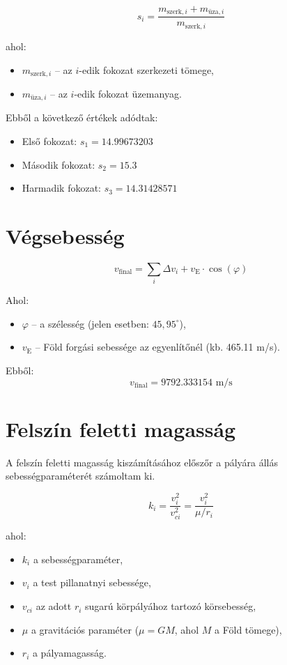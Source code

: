 \documentclass[a4paper,12pt]{article}
\begin{document}
\[
s_i = \frac{m_{\text{szerk},i} + m_{\text{üza},i}}{m_{\text{szerk},i}}
\]

ahol:
\begin{itemize}
  \item \( m_{\text{szerk},i} \) – az \(i\)-edik fokozat szerkezeti tömege,
  \item \( m_{\text{üza},i} \) – az \(i\)-edik fokozat üzemanyag.
\end{itemize}

Ebből a következő értékek adódtak:
\begin{itemize}
    \item Első fokozat: \(s_1 = 14.99673203\)
    \item Második fokozat: \(s_2 = 15.3\)
    \item Harmadik fokozat: \(s_3 = 14.31428571\)
\end{itemize}

\section{Végsebesség}
\[
v_{\text{final}} = \sum_i \Delta v_i + v_{\text{E}} \cdot \cos(\varphi)
\]

Ahol:
\begin{itemize}
  \item \( \varphi \) – a szélesség (jelen esetben: \(45{,}95^\circ\)),
  \item \( v_{\text{E}} \) – Föld forgási sebessége az egyenlítőnél (kb. 465.11 m/s).
\end{itemize}

Ebből:
\[
v_{\text{final}} = 9792.333154 \text{ m/s}
\]


\section{Felszín feletti magasság}

A felszín feletti magasság kiszámításához előszőr a pályára állás sebességparaméterét számoltam ki.

\[
  k_i = \frac{v_i^2}{v_{ci}^2} = \frac{v_i^2}{\mu / r_i}
\]
  
ahol:
\begin{itemize}
    \item $k_i$ a sebességparaméter,
    \item $v_i$ a test pillanatnyi sebessége,
    \item $v_{ci}$ az adott $r_i$ sugarú körpályához tartozó körsebesség,
    \item $\mu$ a gravitációs paraméter ($\mu = G M$, ahol $M$ a Föld tömege),
    \item $r_i$ a pályamagasság.
\end{itemize}
\end{document}
